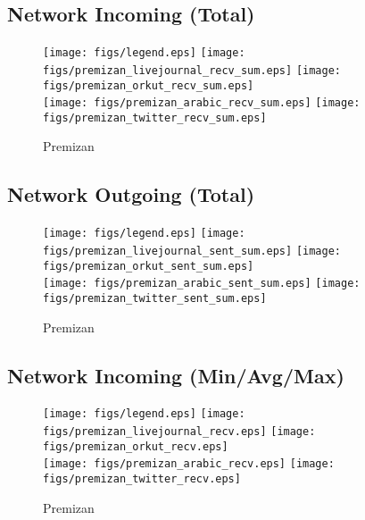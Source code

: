 \documentclass{article}
\newcommand{\bline}[1][1]{\vspace{#1\baselineskip}}
\begin{document}
\pagebreak
\subsection{Network Incoming (Total)}
\begin{figure}[!h]
  \bline[1]
  \centering
  \texttt{[image: figs/legend.eps]}\hspace{3em}%
  \texttt{[image: figs/premizan\_livejournal\_recv\_sum.eps]}\hspace{1em}%
  \texttt{[image: figs/premizan\_orkut\_recv\_sum.eps]}\\
  \texttt{[image: figs/premizan\_arabic\_recv\_sum.eps]}\hspace{1em}%
  \texttt{[image: figs/premizan\_twitter\_recv\_sum.eps]}
  \caption{Premizan}
\end{figure}

\pagebreak
\subsection{Network Outgoing (Total)}
\begin{figure}[!h]
  \bline[1]
  \centering
  \texttt{[image: figs/legend.eps]}\hspace{3em}%
  \texttt{[image: figs/premizan\_livejournal\_sent\_sum.eps]}\hspace{1em}%
  \texttt{[image: figs/premizan\_orkut\_sent\_sum.eps]}\\
  \texttt{[image: figs/premizan\_arabic\_sent\_sum.eps]}\hspace{1em}%
  \texttt{[image: figs/premizan\_twitter\_sent\_sum.eps]}
  \caption{Premizan}
\end{figure}

\pagebreak
\subsection{Network Incoming (Min/Avg/Max)}
\begin{figure}[!h]
  \bline[1]
  \centering
  \texttt{[image: figs/legend.eps]}\hspace{3em}%
  \texttt{[image: figs/premizan\_livejournal\_recv.eps]}\hspace{1em}%
  \texttt{[image: figs/premizan\_orkut\_recv.eps]}\\
  \texttt{[image: figs/premizan\_arabic\_recv.eps]}\hspace{1em}%
  \texttt{[image: figs/premizan\_twitter\_recv.eps]}
  \caption{Premizan}
\end{figure}
\end{document}
